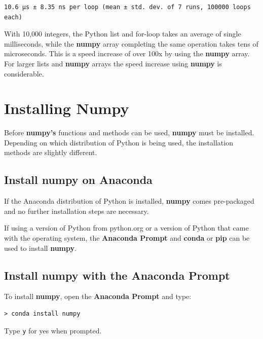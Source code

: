 \documentclass{book}
\begin{document}
    \begin{Verbatim}[commandchars=\\\{\}]
10.6 µs ± 8.35 ns per loop (mean ± std. dev. of 7 runs, 100000 loops each)

    \end{Verbatim}

    With 10,000 integers, the Python list and for-loop takes an average of
single milliseconds, while the \textbf{numpy} array completing the same
operation takes tens of microseconds. This is a speed increase of over
100x by using the \textbf{numpy} array. For larger lists and
\textbf{numpy} arrays the speed increase using \textbf{numpy} is
considerable.

    \section{Installing Numpy}\label{installing-numpy}

    Before \textbf{numpy's} functions and methods can be used,
\textbf{numpy} must be installed. Depending on which distribution of
Python is being used, the installation methods are slightly different.

    \subsection{Install numpy on Anaconda}\label{install-numpy-on-anaconda}

If the Anaconda distribution of Python is installed, \textbf{numpy}
comes pre-packaged and no further installation steps are necessary.

If using a version of Python from python.org or a version of Python that
came with the operating system, the \textbf{Anaconda Prompt} and
\textbf{conda} or \textbf{pip} can be used to install \textbf{numpy}.

    \subsection{Install numpy with the Anaconda
Prompt}\label{install-numpy-with-the-anaconda-prompt}

To install \textbf{numpy}, open the \textbf{Anaconda Prompt} and type:

\begin{lstlisting}
> conda install numpy
\end{lstlisting}

Type \lstinline!y! for yes when prompted.
\end{document}
